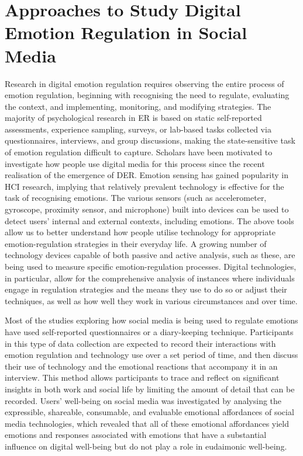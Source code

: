 \documentclass[lettersize,journal]{IEEEtran}
\begin{document}
\section{Approaches to Study Digital Emotion Regulation in Social Media}
Research in digital emotion regulation requires observing the entire process of emotion regulation, beginning with recognising the need to regulate, evaluating the context, and implementing, monitoring, and modifying strategies. The majority of psychological research in ER is based on static self-reported assessments, experience sampling, surveys, or lab-based tasks collected via questionnaires, interviews, and group discussions, making the state-sensitive task of emotion regulation difficult to capture. Scholars have been motivated to investigate how people use digital media for this process since the recent realisation of the emergence of DER. Emotion sensing has gained popularity in HCI research, implying that relatively prevalent technology is effective for the task of recognising emotions. The various sensors (such as accelerometer, gyroscope, proximity sensor, and microphone) built into devices can be used to detect users' internal and external contexts, including emotions. The above tools allow us to better understand how people utilise technology for appropriate emotion-regulation strategies in their everyday life. A growing number of technology devices capable of both passive and active analysis, such as these, are being used to measure specific emotion-regulation processes. Digital technologies, in particular, allow for the comprehensive analysis of instances where individuals engage in regulation strategies and the means they use to do so or adjust their techniques, as well as how well they work in various circumstances and over time. 


Most of the studies exploring how social media is being used to regulate emotions have used self-reported questionnaires or a diary-keeping technique. Participants in this type of data collection are expected to record their interactions with emotion regulation and technology use over a set period of time, and then discuss their use of technology and the emotional reactions that accompany it in an interview. This method allows participants to trace and reflect on significant insights in both work and social life by limiting the amount of detail that can be recorded. Users' well-being on social media was investigated by analysing the expressible, shareable, consumable, and evaluable emotional affordances of social media technologies, which revealed that all of these emotional affordances yield emotions and responses associated with emotions that have a substantial influence on digital well-being but do not play a role in eudaimonic well-being. 
\end{document}
